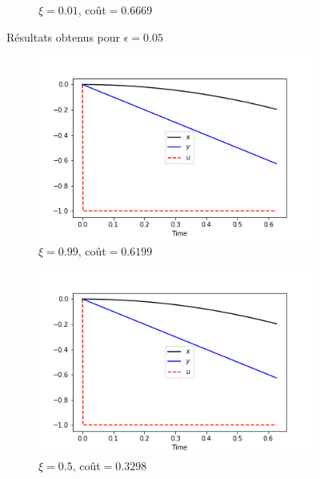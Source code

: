 \documentclass[
	french,
	11pt, %
]{fphw}
\begin{document}
\begin{figure}[H]
\begin{subfigure}[b]{0.32\textwidth}
        \caption{$\xi = 0.01$, coût$=0.6669$}
        \label{fig:23}
    \end{subfigure}
       \caption{Résultats obtenus pour $\epsilon= 0.05$}
       \label{fig:epsFaible}
\end{figure}


\begin{figure}[H]
    \centering
    \begin{subfigure}[b]{0.32\textwidth}
        \includegraphics[width=\textwidth]{Exo24.png}
        \caption{$\xi = 0.99$, coût$=0.6199$}
        \label{fig:24}
    \end{subfigure}
    \begin{subfigure}[b]{0.32\textwidth}
        \includegraphics[width=\textwidth]{Exo25.png}
        \caption{$\xi = 0.5$, coût$=0.3298$}
        \label{fig:25}
	\end{subfigure}
    \begin{subfigure}[b]{0.32\textwidth}

\end{subfigure}
\end{figure}
\end{document}
